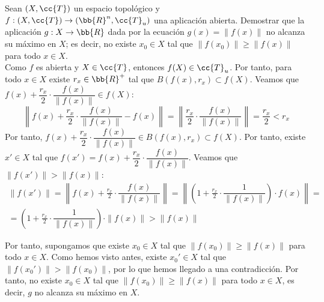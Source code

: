 \documentclass[12pt]{article}
\newcommand{\T}[0]{\cc{T}}
\begin{document}
    \begin{ejercicio}[5 puntos]
        Sean $(X,\T)$ un espacio topológico y $f:(X,\T)\to (\bb{R}^n,\T_u)$ una aplicación abierta.
        Demostrar que la aplicación $g:X\to \bb{R}$ dada por la ecuación $g(x)=\|f(x)\|$ no alcanza su máximo en $X$;
        es decir, no existe $x_0\in X$ tal que $\|f(x_0)\|\geq \|f(x)\|$ para todo $x\in X$.\\

        Como $f$ es abierta y $X\in \T$, entonces $f(X)\in \T_u$. Por tanto, para todo $x\in X$ existe $r_x\in \bb{R}^+$ tal que $B(f(x),r_x)\subset f(X)$.
        Veamos que $f(x) + \dfrac{r_x}{2}\cdot \dfrac{f(x)}{\|f(x)\|} \in f(X)$:
        \begin{equation*}
            \left\|f(x) + \frac{r_x}{2}\cdot \dfrac{f(x)}{\|f(x)\|} - f(x)\right\| = \left\|\frac{r_x}{2}\cdot \dfrac{f(x)}{\|f(x)\|}\right\| = \frac{r_x}{2} < r_x
        \end{equation*}
        Por tanto, $f(x) + \dfrac{r_x}{2}\cdot \dfrac{f(x)}{\|f(x)\|} \in B(f(x),r_x)\subset f(X)$. Por tanto, existe $x'\in X$ tal que
        $f(x') = f(x) + \dfrac{r_x}{2}\cdot \dfrac{f(x)}{\|f(x)\|}$. Veamos que $\|f(x')\| > \|f(x)\|$:
        \begin{multline*}
            \|f(x')\| = \left\|f(x) + \frac{r_x}{2}\cdot \dfrac{f(x)}{\|f(x)\|}\right\| = \left\|\left(1 + \frac{r_x}{2}\cdot \dfrac{1}{\|f(x)\|}\right)\cdot f(x)\right\|
            =\\= \left(1 + \frac{r_x}{2}\cdot \dfrac{1}{\|f(x)\|}\right)\cdot \|f(x)\| > \|f(x)\|
        \end{multline*}

        Por tanto, supongamos que existe $x_0\in X$ tal que $\|f(x_0)\|\geq \|f(x)\|$ para todo $x\in X$. Como hemos visto antes, existe $x_0'\in X$ tal que $\|f(x_0')\| > \|f(x_0)\|$, por
        lo que hemos llegado a una contradicción. Por tanto, no existe $x_0\in X$ tal que $\|f(x_0)\|\geq \|f(x)\|$ para todo $x\in X$, es decir, $g$ no alcanza su máximo en $X$.
    \end{ejercicio}
\end{document}
